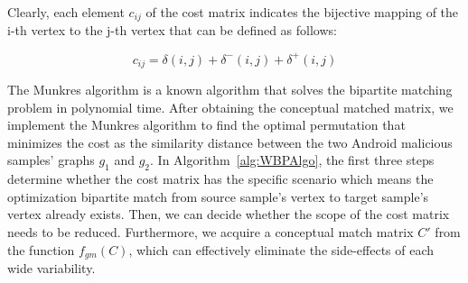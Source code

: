  Clearly, each element $c_{ij}$ of the cost matrix indicates the bijective mapping of the i-th vertex to the j-th vertex that can be defined as follows:
  
  \begin{equation}
        \label{eq:cost_element}
 c_{ij} = \delta \left ( i, j \right ) + \delta^{-} \left ( i, j \right ) + \delta^{+} \left ( i, j \right )
   \end{equation}

The Munkres algorithm \cite{p:Munkres57} \cite{p:Kuhn56} is a known algorithm that solves the bipartite matching problem in polynomial time. After obtaining the conceptual matched matrix,  we implement the Munkres algorithm to find the optimal permutation that minimizes the cost as the similarity distance between the two Android malicious samples' graphs $g_{1}$ and $g_{2}$. In Algorithm~\ref{alg:WBPAlgo}, the first three steps determine whether the cost matrix has the specific scenario which means the optimization bipartite match from source sample's vertex to target sample's vertex already exists. Then, we can decide whether the scope of the cost matrix needs to be reduced. Furthermore, we acquire a conceptual match matrix $C'$ from the function $f_{gm}(C)$, which can effectively eliminate the side-effects of each wide variability.
